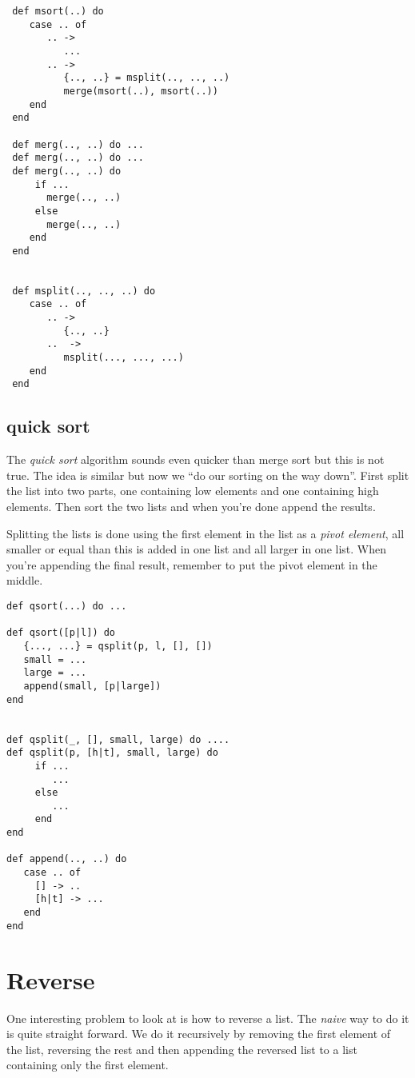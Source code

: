 \documentclass[a4paper,11pt]{article}
\begin{document}
{\begin{verbatim}
 def msort(..) do
    case .. of
       .. -> 
          ...
       .. ->
          {.., ..} = msplit(.., .., ..)
          merge(msort(..), msort(..))
    end
 end

 def merg(.., ..) do ...
 def merg(.., ..) do ...
 def merg(.., ..) do
     if ... 
       merge(.., ..)
     else 
       merge(.., ..)
    end
 end


 def msplit(.., .., ..) do
    case .. of
       .. -> 
          {.., ..}
       ..  ->
          msplit(..., ..., ...)
    end
 end
\end{verbatim}

\subsection{quick sort}

The {\em quick sort} algorithm sounds even quicker than merge sort but
this is not true. The idea is similar but now we ``do our sorting on
the way down''. First split the list into two parts, one containing low
elements and one containing high elements. Then sort the two lists and
when you're done append the results. 

Splitting the lists is done using the first element in the list as a
{\em pivot element}, all smaller or equal than this is added in one
list and all larger in one list. When you're appending the final
result, remember to put the pivot element in the middle.

\begin{verbatim}
def qsort(...) do ...

def qsort([p|l]) do 
   {..., ...} = qsplit(p, l, [], [])
   small = ...
   large = ...
   append(small, [p|large])
end


def qsplit(_, [], small, large) do ....
def qsplit(p, [h|t], small, large) do
     if ... 
        ...
     else
        ...
     end
end

def append(.., ..) do
   case .. of
     [] -> ..
     [h|t] -> ...
   end
end

\end{verbatim}

\section{Reverse}

One interesting problem to look at is how to reverse a list. The {\em
  naive} way to do it is quite straight forward. We do it recursively
by removing the first element of the list, reversing the rest and then
appending the reversed list to a list containing only the first element.

}
\end{document}
